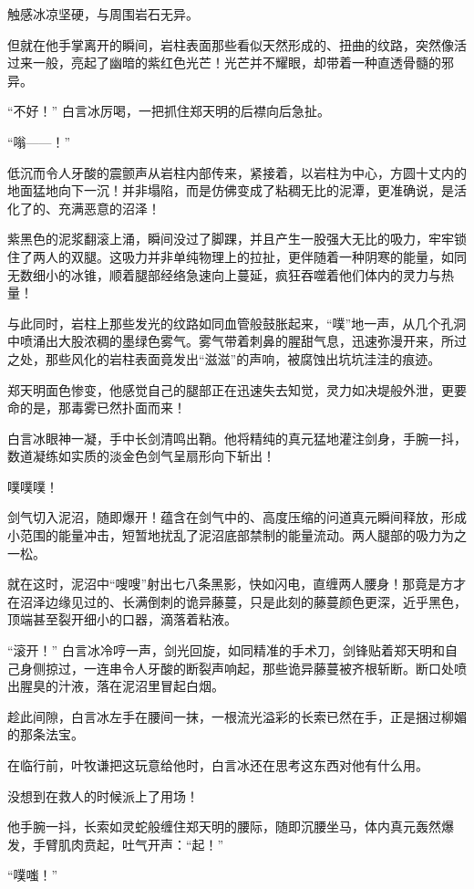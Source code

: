 触感冰凉坚硬，与周围岩石无异。

但就在他手掌离开的瞬间，岩柱表面那些看似天然形成的、扭曲的纹路，突然像活过来一般，亮起了幽暗的紫红色光芒！光芒并不耀眼，却带着一种直透骨髓的邪异。

“不好！” 白言冰厉喝，一把抓住郑天明的后襟向后急扯。

“嗡——！”

低沉而令人牙酸的震颤声从岩柱内部传来，紧接着，以岩柱为中心，方圆十丈内的地面猛地向下一沉！并非塌陷，而是仿佛变成了粘稠无比的泥潭，更准确说，是活化了的、充满恶意的沼泽！

紫黑色的泥浆翻滚上涌，瞬间没过了脚踝，并且产生一股强大无比的吸力，牢牢锁住了两人的双腿。这吸力并非单纯物理上的拉扯，更伴随着一种阴寒的能量，如同无数细小的冰锥，顺着腿部经络急速向上蔓延，疯狂吞噬着他们体内的灵力与热量！

与此同时，岩柱上那些发光的纹路如同血管般鼓胀起来，“噗”地一声，从几个孔洞中喷涌出大股浓稠的墨绿色雾气。雾气带着刺鼻的腥甜气息，迅速弥漫开来，所过之处，那些风化的岩柱表面竟发出“滋滋”的声响，被腐蚀出坑坑洼洼的痕迹。

郑天明面色惨变，他感觉自己的腿部正在迅速失去知觉，灵力如决堤般外泄，更要命的是，那毒雾已然扑面而来！

白言冰眼神一凝，手中长剑清鸣出鞘。他将精纯的真元猛地灌注剑身，手腕一抖，数道凝练如实质的淡金色剑气呈扇形向下斩出！

噗噗噗！

剑气切入泥沼，随即爆开！蕴含在剑气中的、高度压缩的问道真元瞬间释放，形成小范围的能量冲击，短暂地扰乱了泥沼底部禁制的能量流动。两人腿部的吸力为之一松。

就在这时，泥沼中“嗖嗖”射出七八条黑影，快如闪电，直缠两人腰身！那竟是方才在沼泽边缘见过的、长满倒刺的诡异藤蔓，只是此刻的藤蔓颜色更深，近乎黑色，顶端甚至裂开细小的口器，滴落着粘液。

“滚开！” 白言冰冷哼一声，剑光回旋，如同精准的手术刀，剑锋贴着郑天明和自己身侧掠过，一连串令人牙酸的断裂声响起，那些诡异藤蔓被齐根斩断。断口处喷出腥臭的汁液，落在泥沼里冒起白烟。

趁此间隙，白言冰左手在腰间一抹，一根流光溢彩的长索已然在手，正是捆过柳媚的那条法宝。

在临行前，叶牧谦把这玩意给他时，白言冰还在思考这东西对他有什么用。

没想到在救人的时候派上了用场！

他手腕一抖，长索如灵蛇般缠住郑天明的腰际，随即沉腰坐马，体内真元轰然爆发，手臂肌肉贲起，吐气开声：“起！”

“噗嗤！”

